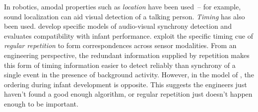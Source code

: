 In robotics, amodal properties such as {\em location} have been
used~-- for example, sound localization can aid visual detection of a
talking person.  {\em Timing} has also been used.  
 develop
specific models of audio-visual synchrony detection and
evaluates compatibility with infant performance.
 exploit the specific timing cue 
of {\em regular repetition}
to form correspondences across sensor modalities.  
From an engineering perspective,
the redundant information supplied by repetition makes this
form of timing information easier to detect reliably 
than synchrony of a single event in the presence of background 
activity.  However, in the model of ,
the ordering during infant development is opposite.
%
This suggests the engineers just haven't found a good enough algorithm,
or regular repetition just doesn't happen enough to be important.







